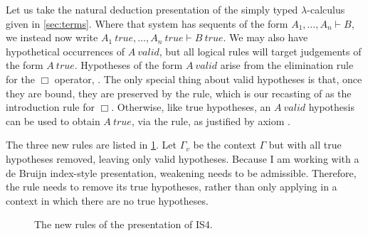 Let us take the natural deduction presentation of the simply typed
$\lambda$-calculus given in \cref{sec:terms}.
Where that system has sequents of the form $A_1, \ldots, A_n \vdash B$, we
instead now write
$A_1~\mathit{true}, \ldots, A_n~\mathit{true} \vdash B~\mathit{true}$.
We may also have hypothetical occurrences of $A~\mathit{valid}$, but all logical
rules will target judgements of the form $A~\mathit{true}$.
Hypotheses of the form $A~\mathit{valid}$ arise from the elimination rule for
the $\Box$ operator, .
The only special thing about valid hypotheses is that, once they are bound, they
are preserved by the  rule, which is our recasting of
 as the introduction rule for $\Box$.
Otherwise, like true hypotheses, an $A~\mathit{valid}$ hypothesis can be used to
obtain $A~\mathit{true}$, via the  rule, as justified by axiom
.

The three new rules are listed in \cref{fig:PD}.
Let $\Gamma_v$ be the context $\Gamma$ but with all true hypotheses removed,
leaving only valid hypotheses.
Because I am working with a de Bruijn index-style presentation, weakening needs
to be admissible.
Therefore, the  rule needs to remove its true hypotheses,
rather than only applying in a context in which there are no true hypotheses.

\begin{figure}
  \caption{The new rules of the \citeauthor{judgmental} presentation of IS4.}
  \label{fig:PD}
\end{figure}

